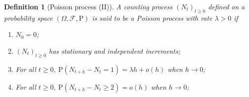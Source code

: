 \documentclass{article}
\newtheorem{definition}{Definition}[section]
\begin{document}
\begin{definition}[Poisson process (II)]
	A counting process $(N_t)_{t\ge0}$ defined on a probability space $(\Omega,\mathcal{F},\mathrm{P})$ is said to be a \emph{Poisson process} with rate $\lambda>0$ if
	\begin{enumerate}
		\item $N_0=0$;
		\item $(N_t)_{t\ge0}$ has stationary and independent increments;
		\item For all $t\ge0$, $\mathrm{P}(N_{t+h}-N_t=1)=\lambda h+o(h)$ when $h\to0$;
		\item For all $t\ge0$, $\mathrm{P}(N_{t+h}-N_t\ge2)=o(h)$ when $h\to0$;
	\end{enumerate}	
\end{definition}
\end{document}
